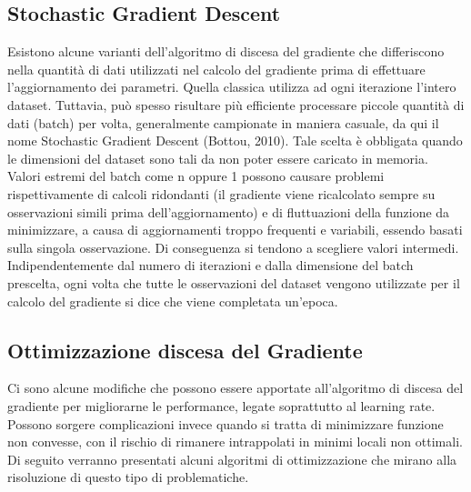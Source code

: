 \subsection{Stochastic Gradient Descent}
Esistono alcune varianti dell'algoritmo di discesa del gradiente che differiscono nella quantità di dati utilizzati nel calcolo del gradiente prima di effettuare l'aggiornamento dei parametri. Quella classica utilizza ad ogni iterazione l'intero dataset. Tuttavia, può spesso risultare più efficiente processare piccole quantità di dati (batch) per volta, generalmente campionate in maniera casuale, da qui il nome Stochastic Gradient Descent (Bottou, 2010). Tale scelta è obbligata quando le dimensioni del dataset sono tali da non poter essere caricato in memoria. Valori estremi del batch come n oppure 1 possono causare problemi rispettivamente di calcoli ridondanti (il gradiente viene ricalcolato sempre su osservazioni simili prima dell'aggiornamento) e di fluttuazioni della funzione da minimizzare, a causa di aggiornamenti troppo frequenti e variabili, essendo basati sulla singola osservazione. Di conseguenza si tendono a scegliere valori intermedi. Indipendentemente dal numero di iterazioni e dalla dimensione del batch prescelta, ogni volta che tutte le osservazioni del dataset vengono utilizzate per il calcolo del gradiente si dice che viene completata un'epoca.

\subsection{Ottimizzazione discesa del Gradiente}
Ci sono alcune modifiche che possono essere apportate all'algoritmo di discesa del gradiente per migliorarne le performance, legate soprattutto al learning rate. Possono sorgere complicazioni invece quando si tratta di minimizzare funzione non convesse, con il rischio di rimanere intrappolati in minimi locali non ottimali. Di seguito verranno presentati alcuni algoritmi di ottimizzazione che mirano alla risoluzione di questo tipo di problematiche.

